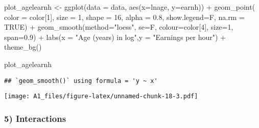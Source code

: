 \documentclass[
]{article}
\newenvironment{Shaded}{\begin{snugshade}}{\end{snugshade}}
\newcommand{\AttributeTok}[1]{\textcolor[rgb]{0.77,0.63,0.00}{#1}}
\newcommand{\ConstantTok}[1]{\textcolor[rgb]{0.00,0.00,0.00}{#1}}
\newcommand{\DecValTok}[1]{\textcolor[rgb]{0.00,0.00,0.81}{#1}}
\newcommand{\FloatTok}[1]{\textcolor[rgb]{0.00,0.00,0.81}{#1}}
\newcommand{\FunctionTok}[1]{\textcolor[rgb]{0.00,0.00,0.00}{#1}}
\newcommand{\NormalTok}[1]{#1}
\newcommand{\OtherTok}[1]{\textcolor[rgb]{0.56,0.35,0.01}{#1}}
\newcommand{\SpecialCharTok}[1]{\textcolor[rgb]{0.00,0.00,0.00}{#1}}
\newcommand{\StringTok}[1]{\textcolor[rgb]{0.31,0.60,0.02}{#1}}
\begin{document}
\begin{Shaded}
\begin{Highlighting}[]
\NormalTok{plot\_agelearnh }\OtherTok{\textless{}{-}} \FunctionTok{ggplot}\NormalTok{(}\AttributeTok{data =}\NormalTok{ data, }\FunctionTok{aes}\NormalTok{(}\AttributeTok{x=}\NormalTok{lnage, }\AttributeTok{y=}\NormalTok{earnh)) }\SpecialCharTok{+}
  \FunctionTok{geom\_point}\NormalTok{( }\AttributeTok{color =}\NormalTok{ color[}\DecValTok{1}\NormalTok{], }\AttributeTok{size =} \DecValTok{1}\NormalTok{,  }\AttributeTok{shape =} \DecValTok{16}\NormalTok{, }\AttributeTok{alpha =} \FloatTok{0.8}\NormalTok{, }\AttributeTok{show.legend=}\NormalTok{F, }
              \AttributeTok{na.rm =} \ConstantTok{TRUE}\NormalTok{) }\SpecialCharTok{+} 
  \FunctionTok{geom\_smooth}\NormalTok{(}\AttributeTok{method=}\StringTok{"loess"}\NormalTok{, }\AttributeTok{se=}\NormalTok{F, }\AttributeTok{colour=}\NormalTok{color[}\DecValTok{4}\NormalTok{], }\AttributeTok{size=}\DecValTok{1}\NormalTok{, }\AttributeTok{span=}\FloatTok{0.9}\NormalTok{) }\SpecialCharTok{+}
  \FunctionTok{labs}\NormalTok{(}\AttributeTok{x =} \StringTok{"Age (years) in log"}\NormalTok{,}\AttributeTok{y =} \StringTok{"Earnings per hour"}\NormalTok{) }\SpecialCharTok{+}
  \FunctionTok{theme\_bg}\NormalTok{()}

\NormalTok{plot\_agelearnh}
\end{Highlighting}
\end{Shaded}

\begin{verbatim}
## `geom_smooth()` using formula = 'y ~ x'
\end{verbatim}

\texttt{[image: A1\_files/figure-latex/unnamed-chunk-18-3.pdf]}

\hypertarget{interactions}{%
\subsubsection{5) Interactions}\label{interactions}}
\end{document}
